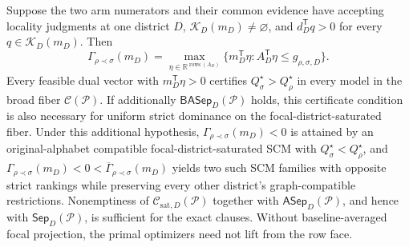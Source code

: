 Suppose the two arm numerators and their common evidence have accepting locality judgments at one district \(D\), \(\mathcal K_D(m_D)\ne\varnothing\), and \(d_D^{\mathsf T}q>0\) for every \(q\in\mathcal K_D(m_D)\). Then
\[
\Gamma_{\rho\prec\sigma}(m_D)=
\max_{\eta\in\mathbb R^{\operatorname{rows}(A_D)}}
\{m_D^{\mathsf T}\eta:A_D^{\mathsf T}\eta\le g_{\rho,\sigma,D}\}.
\]
Every feasible dual vector with \(m_D^{\mathsf T}\eta>0\) certifies \(Q_\sigma^\star>Q_\rho^\star\) in every model in the broad fiber \(\mathcal C(\mathcal P)\). If additionally \(\mathsf{BASep}_D(\mathcal P)\) holds, this certificate condition is also necessary for uniform strict dominance on the focal-district-saturated fiber. Under this additional hypothesis, \(\Gamma_{\rho\prec\sigma}(m_D)<0\) is attained by an original-alphabet compatible focal-district-saturated SCM with \(Q_\sigma^\star<Q_\rho^\star\), and \(\Gamma_{\rho\prec\sigma}(m_D)<0<\overline\Gamma_{\rho\prec\sigma}(m_D)\) yields two such SCM families with opposite strict rankings while preserving every other district's graph-compatible restrictions. Nonemptiness of \(\mathcal C_{\mathrm{sat},D}(\mathcal P)\) together with \(\mathsf{ASep}_D(\mathcal P)\), and hence with \(\mathsf{Sep}_D(\mathcal P)\), is sufficient for the exact clauses. Without baseline-averaged focal projection, the primal optimizers need not lift from the row face.